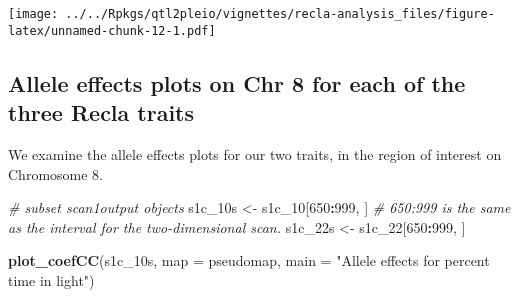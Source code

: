 \documentclass[oneside]{book}
\newenvironment{Shaded}{\begin{snugshade}}{\end{snugshade}}
\newcommand{\CommentTok}[1]{\textcolor[rgb]{0.56,0.35,0.01}{\textit{#1}}}
\newcommand{\DataTypeTok}[1]{\textcolor[rgb]{0.13,0.29,0.53}{#1}}
\newcommand{\DecValTok}[1]{\textcolor[rgb]{0.00,0.00,0.81}{#1}}
\newcommand{\KeywordTok}[1]{\textcolor[rgb]{0.13,0.29,0.53}{\textbf{#1}}}
\newcommand{\NormalTok}[1]{#1}
\newcommand{\OperatorTok}[1]{\textcolor[rgb]{0.81,0.36,0.00}{\textbf{#1}}}
\newcommand{\OtherTok}[1]{\textcolor[rgb]{0.56,0.35,0.01}{#1}}
\newcommand{\StringTok}[1]{\textcolor[rgb]{0.31,0.60,0.02}{#1}}
\begin{document}
\texttt{[image: ../../Rpkgs/qtl2pleio/vignettes/recla-analysis\_files/figure-latex/unnamed-chunk-12-1.pdf]}

\hypertarget{allele-effects-plots-on-chr-8-for-each-of-the-three-recla-traits}{%
\subsection{Allele effects plots on Chr 8 for each of the three Recla
traits}\label{allele-effects-plots-on-chr-8-for-each-of-the-three-recla-traits}}

We examine the allele effects plots for our two traits, in the region of
interest on Chromosome 8.

\begin{Shaded}
\end{Shaded}

\begin{Shaded}
\begin{Highlighting}[]
\CommentTok{# subset scan1output objects}
\NormalTok{s1c_10s <-}\StringTok{ }\NormalTok{s1c_}\DecValTok{10}\NormalTok{[}\DecValTok{650}\OperatorTok{:}\DecValTok{999}\NormalTok{, ] }\CommentTok{# 650:999 is the same as the interval for the two-dimensional scan.}
\NormalTok{s1c_22s <-}\StringTok{ }\NormalTok{s1c_}\DecValTok{22}\NormalTok{[}\DecValTok{650}\OperatorTok{:}\DecValTok{999}\NormalTok{, ]}
\end{Highlighting}
\end{Shaded}

\begin{Shaded}
\begin{Highlighting}[]
\KeywordTok{plot_coefCC}\NormalTok{(s1c_10s, }\DataTypeTok{map =}\NormalTok{ pseudomap, }\DataTypeTok{main =} \StringTok{"Allele effects for percent time in light"}\NormalTok{)}
\end{Highlighting}
\end{Shaded}
\end{document}
